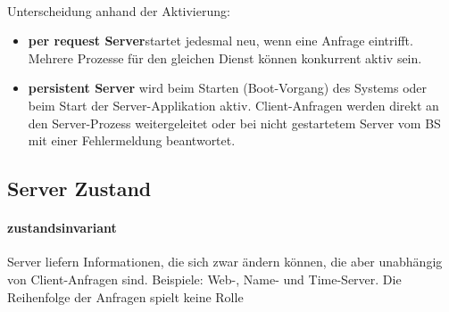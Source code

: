 \documentclass[a4paper]{article}
\begin{document}
		\paragraph{} Unterscheidung anhand der Aktivierung:
			\begin{itemize}
				\item \textbf{per request Server}startet jedesmal neu, wenn eine Anfrage eintrifft. Mehrere Prozesse für den gleichen Dienst können konkurrent aktiv sein.
				\item \textbf{persistent Server} wird beim Starten (Boot-Vorgang) des Systems oder beim Start der Server-Applikation aktiv. Client-Anfragen werden direkt an den Server-Prozess weitergeleitet oder bei nicht gestartetem Server vom BS mit einer Fehlermeldung beantwortet.
			\end{itemize}
	\subsection{Server Zustand}
		\paragraph{zustandsinvariant}Server liefern Informationen, die sich zwar ändern können, die aber unabhängig von Client-Anfragen sind. Beispiele: Web-, Name- und Time-Server. Die Reihenfolge der Anfragen spielt keine Rolle
\end{document}
